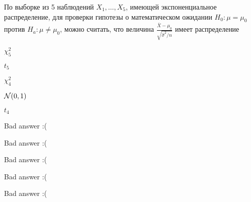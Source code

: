 
\begin{question}
По выборке из 5 наблюдений \(X_1,\ldots,X_{5}\), имеющей
экспоненциальное распределение, для проверки гипотезы о математическом
ожидании \(H_0: \mu = \mu_0\) против \(H_a: \mu \ne \mu_0\), можно
считать, что величина
\(\frac{\bar{X} - \mu_0}{\sqrt{\hat{\sigma}^2 / n}}\) имеет
распределение
\begin{answerlist}
  \item \(\chi^2_5\)
  \item \(t_5\)
  \item \(\chi^2_4\)
  \item \(\mathcal{N}(0,1)\)
  \item \(t_4\)
\end{answerlist}
\end{question}

\begin{solution}
\begin{answerlist}
  \item Bad answer :(
  \item Bad answer :(
  \item Bad answer :(
  \item Bad answer :(
  \item Bad answer :(
\end{answerlist}
\end{solution}

